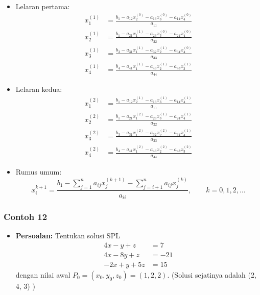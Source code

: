 \documentclass[pdflatex,compress,mathserif]{beamer}
\begin{document}
\begin{frame}
	\begin{itemize}
		\item Lelaran pertama:
		\begin{align*}
		x_1^{(1)} &= \frac{b_1 - a_{12}x_2^{(0)} - a_{13}x_3^{(0)} - a_{14}x_4^{(0)}}{a_{11}}\\
		x_2^{(1)} &= \frac{b_1 - a_{21}x_1^{(1)} - a_{23}x_3^{(0)} - a_{24}x_4^{(0)}}{a_{22}}\\
		x_3^{(1)} &= \frac{b_3 - a_{31}x_1^{(1)} - a_{32}x_2^{(1)} - a_{34}x_4^{(0)}}{a_{33}}\\
		x_4^{(1)} &= \frac{b_4 - a_{41}x_1^{(1)} - a_{43}x_2^{(1)} - a_{43}x_3^{(1)}}{a_{44}}
		\end{align*}
	\end{itemize}
\end{frame}

\begin{frame}
	\begin{itemize}
		\item Lelaran kedua:
		\begin{align*}
		x_1^{(2)} &= \frac{b_1 - a_{12}x_2^{(1)} - a_{13}x_3^{(1)} - a_{14}x_4^{(1)}}{a_{11}}\\
		x_2^{(2)} &= \frac{b_1 - a_{21}x_1^{(2)} - a_{23}x_3^{(1)} - a_{24}x_4^{(1)}}{a_{22}}\\
		x_3^{(2)} &= \frac{b_3 - a_{31}x_1^{(2)} - a_{32}x_2^{(2)} - a_{34}x_4^{(1)}}{a_{33}}\\
		x_4^{(2)} &= \frac{b_4 - a_{41}x_1^{(2)} - a_{43}x_2^{(2)} - a_{43}x_3^{(2)}}{a_{44}}
		\end{align*}
	\end{itemize}
\end{frame}

\begin{frame}
	\begin{itemize}
		\item Rumus umum:
		\[ x_i^{k+1} = \frac{b_1 - \sum\limits_{j=1}^{n}a_{ij}x_j^{(k+1)}-\sum\limits_{j=i+1}^{n}a_{ij}x_j^{(k)}}{a_{ii}},\qquad k=0,1,2,\dots \]
	\end{itemize}
\end{frame}

\begin{frame}
	\frametitle{Contoh 12}
	\begin{itemize}
		\item \textbf{Persoalan:} Tentukan solusi SPL
		\begin{align*}
			4x - y + z &= 7 \\
			4x - 8y + z &= -21 \\
			-2x + y + 5z &= 15
		\end{align*}
		dengan nilai awal $ P_0 = (x_0 , y_0 , z_0) = (1, 2, 2) $. (Solusi sejatinya adalah (2, 4, 3) )
	\end{itemize}
\end{frame}
\end{document}
